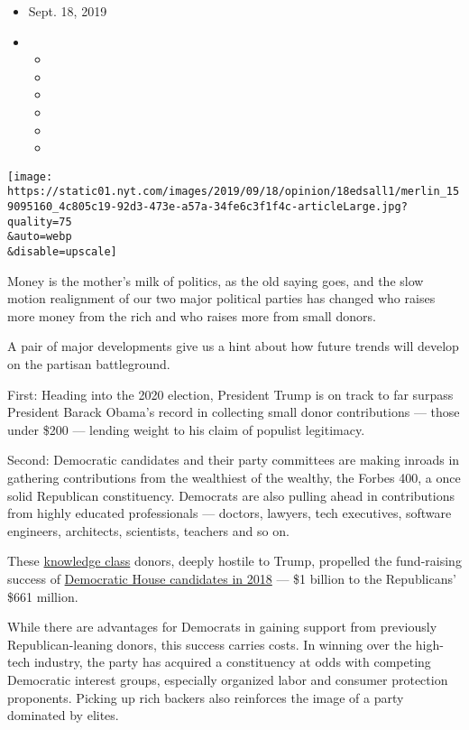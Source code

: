 \begin{itemize}
\item
  Sept. 18, 2019
\item
  \begin{itemize}
  \item
  \item
  \item
  \item
  \item
  \item
  \end{itemize}
\end{itemize}

\texttt{[image: https://static01.nyt.com/images/2019/09/18/opinion/18edsall1/merlin\_159095160\_4c805c19-92d3-473e-a57a-34fe6c3f1f4c-articleLarge.jpg?quality=75\\\&auto=webp\\\&disable=upscale]}

Money is the mother's milk of politics, as the old saying goes, and the
slow motion realignment of our two major political parties has changed
who raises more money from the rich and who raises more from small
donors.

A pair of major developments give us a hint about how future trends will
develop on the partisan battleground.

First: Heading into the 2020 election, President Trump is on track to
far surpass President Barack Obama's record in collecting small donor
contributions --- those under \$200 --- lending weight to his claim of
populist legitimacy.

Second: Democratic candidates and their party committees are making
inroads in gathering contributions from the wealthiest of the wealthy,
the Forbes 400, a once solid Republican constituency. Democrats are also
pulling ahead in contributions from highly educated professionals ---
doctors, lawyers, tech executives, software engineers, architects,
scientists, teachers and so on.

These
\href{https://books.google.com/books?hl=en\&lr=\&id=_MeCr31C9S8C\&oi=fnd\&pg=PR7\&dq=Mosco+and+McKercher+knowledge+worker\&ots=FvIgNUtEdr\&sig=QOCB7sbOf2Y7PT-f4SQZIsvcrh8\#v=onepage\&q=Mosco\%20and\%20McKercher\%20knowledge\%20worker\&f=false}{knowledge
class} donors, deeply hostile to Trump, propelled the fund-raising
success of
\href{https://www.opensecrets.org/overview/index.php?display=T\&type=A\&cycle=2018}{Democratic
House candidates in 2018} --- \$1 billion to the Republicans' \$661
million.

While there are advantages for Democrats in gaining support from
previously Republican-leaning donors, this success carries costs. In
winning over the high-tech industry, the party has acquired a
constituency at odds with competing Democratic interest groups,
especially organized labor and consumer protection proponents. Picking
up rich backers also reinforces the image of a party dominated by
elites.

